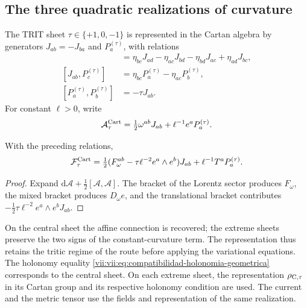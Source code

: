 \subsection{The three quadratic realizations of curvature}

The TRIT sheet \(\tau\in\{+1,0,-1\}\) is represented in
the Cartan algebra by generators \(J_{ab}=-J_{ba}\)
and \(P_a^{(\tau)}\), with relations
\begin{align*}
 [J_{ab},J_{cd}]&=
 \eta_{bc}J_{ad}-\eta_{ac}J_{bd}
 -\eta_{bd}J_{ac}+\eta_{ad}J_{bc},\\
 [J_{ab},P_c^{(\tau)}]&=
 \eta_{bc}P_a^{(\tau)}-\eta_{ac}P_b^{(\tau)},\\
 [P_a^{(\tau)},P_b^{(\tau)}]&=-\tau J_{ab}.
\end{align*}
For constant \(\ell>0\), write
\[
 \mathcal A_\tau^{\rm Cart}
 =\tfrac12\omega^{ab}J_{ab}+\ell^{-1}e^aP_a^{(\tau)}.
\]

\begin{proposition}
\label{vii:vii:prop:curvatura-tritificada}
With the preceding relations,
\begin{equation}
 \mathcal F_\tau^{\rm Cart}
 =\tfrac12(F_\omega^{ab}-\tau\ell^{-2}e^a\wedge e^b)J_{ab}
     +\ell^{-1}T^aP_a^{(\tau)}.
 \label{vii:vii:eq:curvatura-tritificada}
\end{equation}
\end{proposition}
\begin{proof}
Expand \(\mathrm d\mathcal A+\tfrac12[\mathcal A,\mathcal A]\).
The bracket of the Lorentz sector produces \(F_\omega\), the
mixed bracket produces \(D_\omega e\), and the translational
bracket contributes
\(-\tfrac12\tau\ell^{-2}e^a\wedge e^bJ_{ab}\).
\end{proof}

On the central sheet the affine connection is recovered; the extreme sheets
preserve the two signs of the constant-curvature term. The
representation thus retains the tritic regime of the route before
applying the variational equations. The holonomy equality
\eqref{vii:vii:eq:compatibilidad-holonomia-geometrica} corresponds to the
central sheet. On each extreme sheet, the representation
\(\rho_{{\rm C},\tau}\) in its Cartan group and its respective holonomy
condition are used. The current and the metric tensor use
the fields and representation of the same realization.
